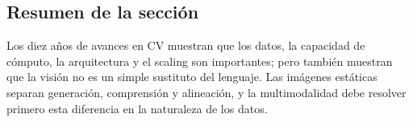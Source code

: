 \subsection{Resumen de la sección}

Los diez años de avances en CV muestran que los datos, la capacidad de cómputo, la arquitectura y el scaling son importantes; pero también muestran que la visión no es un simple sustituto del lenguaje. Las imágenes estáticas separan generación, comprensión y alineación, y la multimodalidad debe resolver primero esta diferencia en la naturaleza de los datos.
